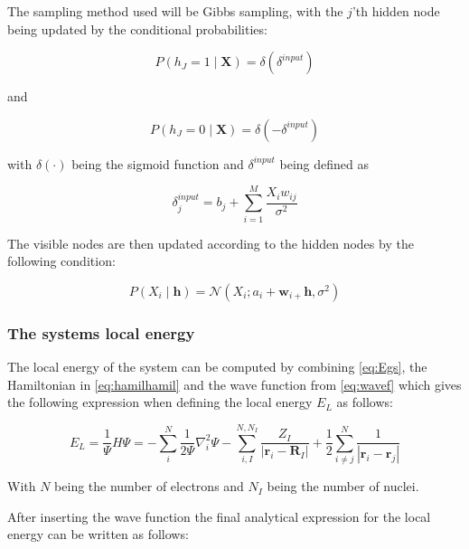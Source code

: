 \documentclass[../main.tex]{subfiles}
\begin{document}
The sampling method used will be Gibbs sampling, with the $j$'th hidden node being updated by the conditional probabilities:

\begin{equation*}
P\left(h_{J}=1 \mid \boldsymbol{X}\right)=\delta\left(\delta^{i n p u t}\right)
\end{equation*}

and 

\begin{equation*}
P\left(h_{J}=0 \mid \boldsymbol{X}\right)=\delta\left(-\delta^{i n p u t}\right)
\end{equation*}

with $\delta(\cdot)$ being the sigmoid function and $\delta^{input}$ being defined as

\begin{equation*}
\delta_{j}^{i n p u t}=b_{j}+\sum_{i=1}^{M} \frac{X_{i} w_{i j}}{\sigma^{2}}
\end{equation*}

The visible nodes are then updated according to the hidden nodes by the following condition:

\begin{equation*}
P\left(X_{i} \mid \mathbf{h}\right)=\mathcal{N}\left(X_{i} ; a_{i}+\mathbf{w}_{i+} \mathbf{h}, \sigma^{2}\right)
\end{equation*}

\subsubsection{The systems local energy}
The local energy of the system can be computed by combining \autoref{eq:Egs}, the Hamiltonian in \autoref{eq:hamilhamil} and the wave function from \autoref{eq:wavef} which gives the following expression when defining the local energy $E_L$ as follows:

\begin{equation*}
E_L=\frac{1}{\Psi}H\Psi =-\sum_{i}^N \frac{1}{2\Psi}\nabla_{i}^{2}\Psi-\sum_{i, I}^{N,N_I} \frac{Z_{I}}{\left|\mathbf{r}_{i}-\mathbf{R}_{I}\right|}+\frac{1}{2} \sum_{i \neq j}^N \frac{1}{\left|\mathbf{r}_{i}-\mathbf{r}_{j}\right|}
\end{equation*}

With $N$ being the number of electrons and $N_I$ being the number of nuclei.

After inserting the wave function the final analytical expression for the local energy can be written as follows:
\end{document}
